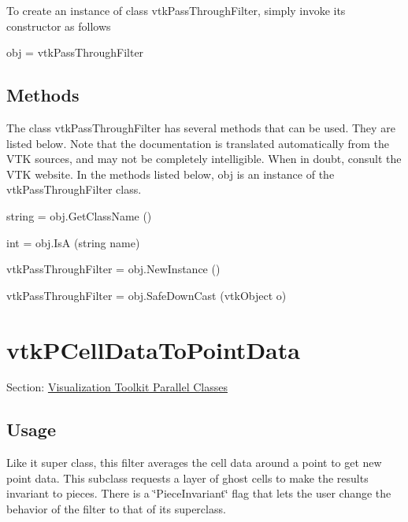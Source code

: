 To create an instance of class vtk\-Pass\-Through\-Filter, simply invoke its constructor as follows \begin{DoxyVerb}  obj = vtkPassThroughFilter
\end{DoxyVerb}
 \hypertarget{vtkwidgets_vtkxyplotwidget_Methods}{}\subsection{Methods}\label{vtkwidgets_vtkxyplotwidget_Methods}
The class vtk\-Pass\-Through\-Filter has several methods that can be used. They are listed below. Note that the documentation is translated automatically from the V\-T\-K sources, and may not be completely intelligible. When in doubt, consult the V\-T\-K website. In the methods listed below, {\ttfamily obj} is an instance of the vtk\-Pass\-Through\-Filter class. 
\begin{DoxyItemize}
\item {\ttfamily string = obj.\-Get\-Class\-Name ()}  
\item {\ttfamily int = obj.\-Is\-A (string name)}  
\item {\ttfamily vtk\-Pass\-Through\-Filter = obj.\-New\-Instance ()}  
\item {\ttfamily vtk\-Pass\-Through\-Filter = obj.\-Safe\-Down\-Cast (vtk\-Object o)}  
\end{DoxyItemize}\hypertarget{vtkparallel_vtkpcelldatatopointdata}{}\section{vtk\-P\-Cell\-Data\-To\-Point\-Data}\label{vtkparallel_vtkpcelldatatopointdata}
Section\-: \hyperlink{sec_vtkparallel}{Visualization Toolkit Parallel Classes} \hypertarget{vtkwidgets_vtkxyplotwidget_Usage}{}\subsection{Usage}\label{vtkwidgets_vtkxyplotwidget_Usage}
Like it super class, this filter averages the cell data around a point to get new point data. This subclass requests a layer of ghost cells to make the results invariant to pieces. There is a \char`\"{}\-Piece\-Invariant\char`\"{} flag that lets the user change the behavior of the filter to that of its superclass.

